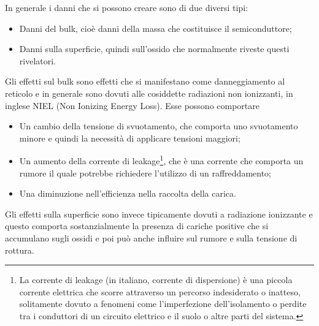In generale i danni che si possono creare sono di due diversi tipi:
\begin{itemize}
   \item Danni del bulk, cioè danni della massa che costituisce il semiconduttore;
   \item Danni sulla superficie, quindi sull'ossido che normalmente riveste questi rivelatori.
\end{itemize}

Gli effetti sul bulk sono effetti che si manifestano come danneggiamento al reticolo e in generale sono dovuti alle cosiddette radiazioni non ionizzanti, in inglese NIEL (Non Ionizing Energy Loss). Esse possono comportare
\begin{itemize}[leftmargin=0.5cm]
   \item Un cambio della tensione di svuotamento, che comporta uno svuotamento minore e quindi la necessità di applicare tensioni maggiori;
   \item Un aumento della corrente di leakage\footnote{La corrente di leakage (in italiano, corrente di dispersione) è una piccola corrente elettrica che scorre attraverso un percorso indesiderato o inatteso, solitamente dovuto a fenomeni come l'imperfezione dell'isolamento o perdite tra i conduttori di un circuito elettrico e il suolo o altre parti del sistema.}, che è una corrente che comporta un rumore il quale potrebbe richiedere l'utilizzo di un raffreddamento;
   \item Una diminuzione nell'efficienza nella raccolta della carica.
\end{itemize}


Gli effetti sulla superficie sono invece tipicamente dovuti a radiazione ionizzante e questo comporta sostanzialmente la presenza di cariche positive che si accumulano sugli ossidi e poi può anche influire sul rumore e sulla tensione di rottura.

